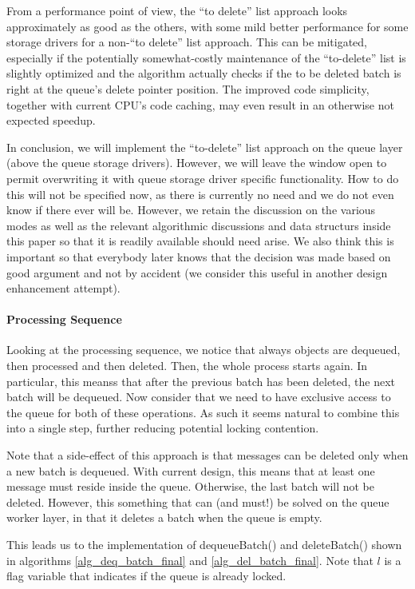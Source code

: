 \documentclass[a4paper,10pt]{article}
\begin{document}
From a performance point of view, the ``to delete'' list approach looks approximately as good as the others, with some mild better performance for some storage drivers for a non-``to delete'' list approach. This can be mitigated, especially if the potentially somewhat-costly maintenance of the ``to-delete'' list is slightly optimized and the algorithm actually checks if the to be deleted batch is right at the queue's delete pointer position. The improved code simplicity, together with current CPU's code caching, may even result in an otherwise not expected speedup.

In conclusion, we will implement the ``to-delete'' list approach on the queue layer (above the queue storage drivers). However, we will leave the window open to permit overwriting it with queue storage driver specific functionality. How to do this will not be specified now, as there is currently no need and we do not even know if there ever will be. However, we retain the discussion on the various modes as well as the relevant algorithmic discussions and data structurs inside this paper so that it is readily available should need arise. We also think this is important so that everybody later knows that the decision was made based on good argument and not by accident (we consider this useful in another design enhancement attempt).

\paragraph{Processing Sequence} Looking at the processing sequence, we notice that always objects are dequeued, then processed and then deleted. Then, the whole process starts again. In particular, this meanss that after the previous batch has been deleted, the next batch will be dequeued. Now consider that we need to have exclusive access to the queue for both of these operations. As such it seems natural to combine this into a single step, further reducing potential locking contention.

Note that a side-effect of this approach is that messages can be deleted only when a new batch is dequeued. With current design, this means that at least one message must reside inside the queue. Otherwise, the last batch will not be deleted. However, this something that can (and must!) be solved on the queue worker layer, in that it deletes a batch when the queue is empty.

This leads us to the implementation of dequeueBatch() and deleteBatch() shown in algorithms \ref{alg_deq_batch_final} and \ref{alg_del_batch_final}. Note that $l$ is a flag variable that indicates if the queue is already locked.
\end{document}
